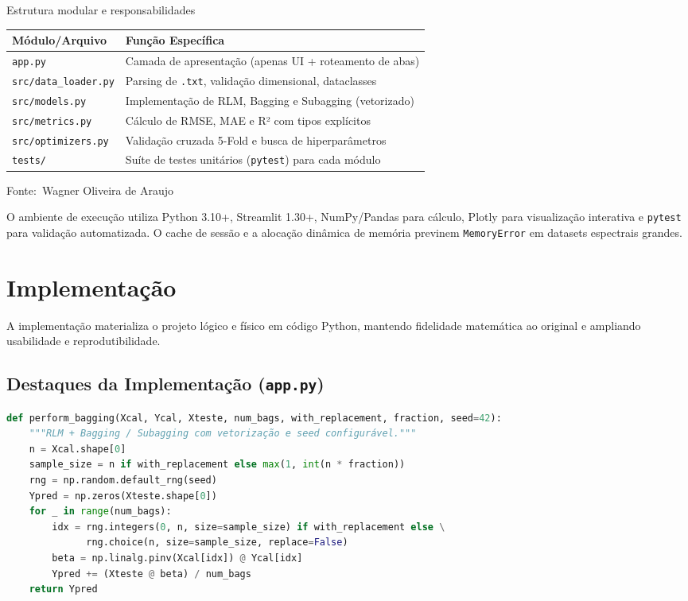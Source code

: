 \documentclass[12pt,a4paper]{article}
\newcommand{\oautor}{Wagner Oliveira de Araujo}
\begin{document}
\begin{quadro}[ht]
\centering
\small
\caption{Estrutura modular e responsabilidades}
\label{quadro:estrutura}
\begin{threeparttable}
\begin{tabularx}{\textwidth}{|l|X|} \hline
\textbf{Módulo/Arquivo} & \textbf{Função Específica} \\ \hline
\texttt{app.py} & Camada de apresentação (apenas UI + roteamento de abas) \\ \hline
\texttt{src/data\_loader.py} & Parsing de \texttt{.txt}, validação dimensional, dataclasses \\ \hline
\texttt{src/models.py} & Implementação de RLM, Bagging e Subagging (vetorizado) \\ \hline
\texttt{src/metrics.py} & Cálculo de RMSE, MAE e R² com tipos explícitos \\ \hline
\texttt{src/optimizers.py} & Validação cruzada 5-Fold e busca de hiperparâmetros \\ \hline
\texttt{tests/} & Suíte de testes unitários (\texttt{pytest}) para cada módulo \\ \hline
\end{tabularx}
\begin{tablenotes}[flushleft]
\footnotesize
\item Fonte:~\oautor
\end{tablenotes}
\end{threeparttable}
\end{quadro}

O ambiente de execução utiliza Python 3.10+, Streamlit 1.30+, NumPy/Pandas para cálculo, Plotly para visualização interativa e \texttt{pytest} para validação automatizada. O cache de sessão e a alocação dinâmica de memória previnem \texttt{MemoryError} em datasets espectrais grandes.

\section{Implementação}

A implementação materializa o projeto lógico e físico em código Python, mantendo fidelidade matemática ao original e ampliando usabilidade e reprodutibilidade.

\subsection{Destaques da Implementação (\texttt{app.py})}
\begin{lstlisting}[language=Python]
def perform_bagging(Xcal, Ycal, Xteste, num_bags, with_replacement, fraction, seed=42):
    """RLM + Bagging / Subagging com vetorização e seed configurável."""
    n = Xcal.shape[0]
    sample_size = n if with_replacement else max(1, int(n * fraction))
    rng = np.random.default_rng(seed)
    Ypred = np.zeros(Xteste.shape[0])
    for _ in range(num_bags):
        idx = rng.integers(0, n, size=sample_size) if with_replacement else \
              rng.choice(n, size=sample_size, replace=False)
        beta = np.linalg.pinv(Xcal[idx]) @ Ycal[idx]
        Ypred += (Xteste @ beta) / num_bags
    return Ypred
\end{lstlisting}
\end{document}
